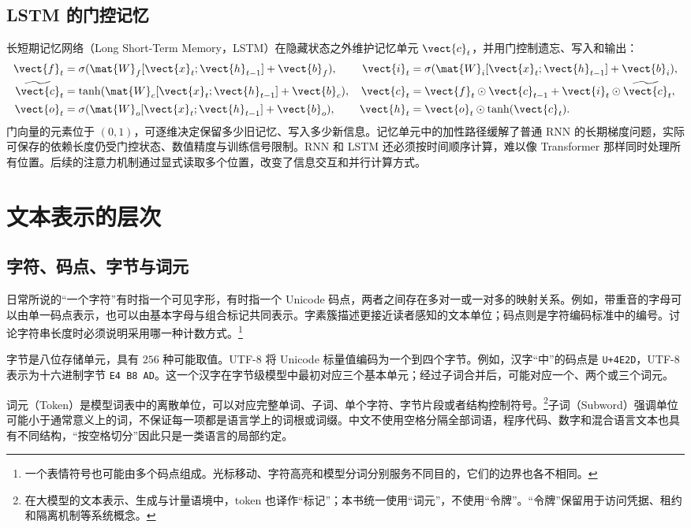 \documentclass[../textbook.tex]{subfiles}
\begin{document}
\subsection{LSTM 的门控记忆}
长短期记忆网络（Long Short-Term Memory，LSTM）在隐藏状态之外维护记忆单元 $\vect{c}_t$，并用门控制遗忘、写入和输出：
\begin{align}
 \vect{f}_t&=\sigma(\mat{W}_f[\vect{x}_t;\vect{h}_{t-1}]+\vect{b}_f),&
 \vect{i}_t&=\sigma(\mat{W}_i[\vect{x}_t;\vect{h}_{t-1}]+\vect{b}_i),\\
 \widetilde{\vect{c}}_t&=\tanh(\mat{W}_c[\vect{x}_t;\vect{h}_{t-1}]+\vect{b}_c),&
 \vect{c}_t&=\vect{f}_t\odot \vect{c}_{t-1}+\vect{i}_t\odot\widetilde{\vect{c}}_t,\\
 \vect{o}_t&=\sigma(\mat{W}_o[\vect{x}_t;\vect{h}_{t-1}]+\vect{b}_o),&
 \vect{h}_t&=\vect{o}_t\odot\tanh(\vect{c}_t).
\end{align}
门向量的元素位于 $(0,1)$，可逐维决定保留多少旧记忆、写入多少新信息。记忆单元中的加性路径缓解了普通 RNN 的长期梯度问题，实际可保存的依赖长度仍受门控状态、数值精度与训练信号限制。RNN 和 LSTM 还必须按时间顺序计算，难以像 Transformer 那样同时处理所有位置。后续的注意力机制通过显式读取多个位置，改变了信息交互和并行计算方式。

\section{文本表示的层次}

\subsection{字符、码点、字节与词元}
日常所说的“一个字符”有时指一个可见字形，有时指一个 Unicode 码点，两者之间存在多对一或一对多的映射关系。例如，带重音的字母可以由单一码点表示，也可以由基本字母与组合标记共同表示。字素簇描述更接近读者感知的文本单位；码点则是字符编码标准中的编号。讨论字符串长度时必须说明采用哪一种计数方式。\footnote{一个表情符号也可能由多个码点组成。光标移动、字符高亮和模型分词分别服务不同目的，它们的边界也各不相同。}

字节是八位存储单元，具有 $256$ 种可能取值。UTF-8 将 Unicode 标量值编码为一个到四个字节。例如，汉字“中”的码点是 \texttt{U+4E2D}，UTF-8 表示为十六进制字节 \texttt{E4 B8 AD}。这一个汉字在字节级模型中最初对应三个基本单元；经过子词合并后，可能对应一个、两个或三个词元。

词元（Token）是模型词表中的离散单位，可以对应完整单词、子词、单个字符、字节片段或者结构控制符号。\footnote{在大模型的文本表示、生成与计量语境中，token 也译作“标记”；本书统一使用“词元”，不使用“令牌”。“令牌”保留用于访问凭据、租约和隔离机制等系统概念。}子词（Subword）强调单位可能小于通常意义上的词，不保证每一项都是语言学上的词根或词缀。中文不使用空格分隔全部词语，程序代码、数字和混合语言文本也具有不同结构，“按空格切分”因此只是一类语言的局部约定。
\end{document}
